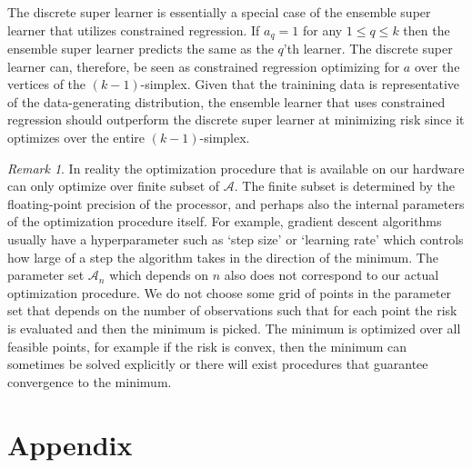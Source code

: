 \documentclass[11pt, a4paper]{article}
\theoremstyle{definition}
\theoremstyle{remark}
\newtheorem*{remark}{Remark}
\newcommand{\q}{q}
\newcommand{\ml}{k}
\begin{document}
The discrete super learner is essentially a special case of the ensemble super learner that utilizes constrained regression. If $ a_\q = 1 $ for any $ 1 \leq \q \leq k $ then the ensemble super learner predicts the same as the $ \q $'th learner. The discrete super learner can, therefore, be seen as constrained regression optimizing for $ a $ over the vertices of the $ (\ml -1) $-simplex. Given that the trainining data is representative of the data-generating distribution, the ensemble learner that uses constrained regression should outperform the discrete super learner at minimizing risk since it optimizes over the entire $ (\ml -1) $-simplex.  

\begin{remark}
In reality the optimization procedure that is available on our hardware can only optimize over finite subset of $ \mathcal{A} $. The finite subset is determined by the floating-point precision of the processor, and perhaps also the internal parameters of the optimization procedure itself. For example, gradient descent algorithms usually have a hyperparameter such as `step size' or `learning rate' which controls how large of a step the algorithm takes in the direction of the minimum. The parameter set $ \mathcal{A}_n $ which depends on $ n $ also does not correspond to our actual optimization procedure. We do not choose some grid of points in the parameter set that depends on the number of observations such that for each point the risk is evaluated and then the minimum is picked. The minimum is optimized over all feasible points, for example if the risk is convex, then the minimum can sometimes be solved explicitly or there will exist procedures that guarantee convergence to the minimum. 
\end{remark}


\newpage

\section{Appendix}
\end{document}

